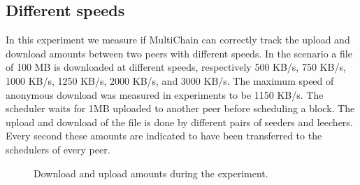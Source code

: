 \subsection{Different speeds }
In this experiment we measure if MultiChain can correctly track the upload and download amounts
between two peers with different speeds.
In the scenario a file of 100 MB is downloaded at different speeds,
respectively 500 KB/s, 750 KB/s, 1000 KB/s, 1250 KB/s, 2000 KB/s, and 3000 KB/s.
The maximum speed of anonymous download was measured in experiments to be 1150 KB/s\cite{ruigrok-anonymous}.
The scheduler waits for 1MB uploaded to another peer before scheduling a block.
The upload and download of the file is done by different pairs of seeders and leechers.
Every second these amounts are indicated to have been transferred to the schedulers of every peer.

\begin{figure}
\centering
{}
\caption{Download and upload amounts during the experiment.}
\label{fig:synthetic-simple-amounts}
\end{figure}

